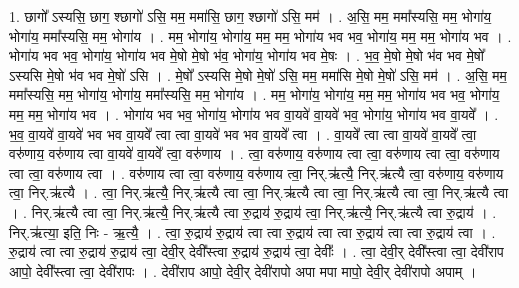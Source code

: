 \documentclass[17pt]{extarticle}
\begin{document}
1. छागो᳚ ऽस्यसि॒ छाग॒ श्छागो॑ ऽसि॒ मम॒ ममा॑सि॒ छाग॒ श्छागो॑ ऽसि॒ मम॑ । . अ॒सि॒ मम॒ ममा᳚स्यसि॒ मम॒ भोगा॑य॒ भोगा॑य॒ ममा᳚स्यसि॒ मम॒ भोगा॑य । . मम॒ भोगा॑य॒ भोगा॑य॒ मम॒ मम॒ भोगा॑य भव भव॒ भोगा॑य॒ मम॒ मम॒ भोगा॑य भव । . भोगा॑य भव भव॒ भोगा॑य॒ भोगा॑य भव मे॒षो मे॒षो भ॑व॒ भोगा॑य॒ भोगा॑य भव मे॒षः । . भ॒व॒ मे॒षो मे॒षो भ॑व भव मे॒षो᳚ ऽस्यसि मे॒षो भ॑व भव मे॒षो॑ ऽसि । . मे॒षो᳚ ऽस्यसि मे॒षो मे॒षो॑ ऽसि॒ मम॒ ममा॑सि मे॒षो मे॒षो॑ ऽसि॒ मम॑ । . अ॒सि॒ मम॒ ममा᳚स्यसि॒ मम॒ भोगा॑य॒ भोगा॑य॒ ममा᳚स्यसि॒ मम॒ भोगा॑य । . मम॒ भोगा॑य॒ भोगा॑य॒ मम॒ मम॒ भोगा॑य भव भव॒ भोगा॑य॒ मम॒ मम॒ भोगा॑य भव । . भोगा॑य भव भव॒ भोगा॑य॒ भोगा॑य भव वा॒यवे॑ वा॒यवे॑ भव॒ भोगा॑य॒ भोगा॑य भव वा॒यवे᳚ । . भ॒व॒ वा॒यवे॑ वा॒यवे॑ भव भव वा॒यवे᳚ त्वा त्वा वा॒यवे॑ भव भव वा॒यवे᳚ त्वा । . वा॒यवे᳚ त्वा त्वा वा॒यवे॑ वा॒यवे᳚ त्वा॒ वरु॑णाय॒ वरु॑णाय त्वा वा॒यवे॑ वा॒यवे᳚ त्वा॒ वरु॑णाय । . त्वा॒ वरु॑णाय॒ वरु॑णाय त्वा त्वा॒ वरु॑णाय त्वा त्वा॒ वरु॑णाय त्वा त्वा॒ वरु॑णाय त्वा । . वरु॑णाय त्वा त्वा॒ वरु॑णाय॒ वरु॑णाय त्वा॒ निर्.ऋ॑त्यै॒ निर्.ऋ॑त्यै त्वा॒ वरु॑णाय॒ वरु॑णाय त्वा॒ निर्.ऋ॑त्यै । . त्वा॒ निर्.ऋ॑त्यै॒ निर्.ऋ॑त्यै त्वा त्वा॒ निर्.ऋ॑त्यै त्वा त्वा॒ निर्.ऋ॑त्यै त्वा त्वा॒ निर्.ऋ॑त्यै त्वा । . निर्.ऋ॑त्यै त्वा त्वा॒ निर्.ऋ॑त्यै॒ निर्.ऋ॑त्यै त्वा रु॒द्राय॑ रु॒द्राय॑ त्वा॒ निर्.ऋ॑त्यै॒ निर्.ऋ॑त्यै त्वा रु॒द्राय॑ । . निर्.ऋ॑त्या॒ इति॒ निः - ऋ॒त्यै॒ । . त्वा॒ रु॒द्राय॑ रु॒द्राय॑ त्वा त्वा रु॒द्राय॑ त्वा त्वा रु॒द्राय॑ त्वा त्वा रु॒द्राय॑ त्वा । . रु॒द्राय॑ त्वा त्वा रु॒द्राय॑ रु॒द्राय॑ त्वा॒ देवी॒र् देवी᳚स्त्वा रु॒द्राय॑ रु॒द्राय॑ त्वा॒ देवीः᳚ । . त्वा॒ देवी॒र् देवी᳚स्त्वा त्वा॒ देवी॑राप आपो॒ देवी᳚स्त्वा त्वा॒ देवी॑रापः । . देवी॑राप आपो॒ देवी॒र् देवी॑रापो अपा मपा मापो॒ देवी॒र् देवी॑रापो अपाम् । \newline
\end{document}
